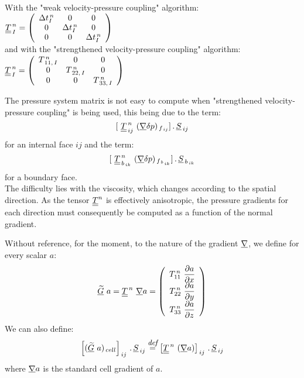 With the "weak velocity-pressure coupling" algorithm:
$ \underline{\underline{T}}_{\,I}^{\,n} = \left(
                      \begin{array} {ccc}
                      \Delta t_I^{\,n} & 0 & 0 \\
                      0 & \Delta t_I^{\,n} & 0 \\
                      0 & 0 & \Delta t_I^{\,n}
                      \end{array}
                \right) $\\
and with the "strengthened velocity-pressure coupling" algorithm:
$ \underline{\underline{T}}_{\,I}^{\,n} = \left(
                      \begin{array} {ccc}
                      T_{\,11,\,I}^{\,n} & 0 & 0 \\
                      0 &  T_{\,22,\,I}^{\,n}&0 \\
                      0 & 0 & T_{\,33,\,I}^{\,n}
                      \end{array}
                \right) $

The pressure system matrix is not easy to compute when "strengthened velocity-pressure coupling" is being used, this being due to the term:
$$[\ \underline{\underline{T}}^{\,n}_{\,ij}\ (\underline{\nabla}{\delta
p})_{\,f_{\,ij}}]\,.\,\underline{S}_{\,ij}$$ for an internal face $ij$ and the term: $$[\ \tens{T}^{\,n}_{\,b_{\,ik}}\ (\grad{\delta p})_{\,f_{\,b_{\,ik}}}]\,.
\,\vect{S}_{\,b_{\,ik}}$$ for a boundary face.\\
The difficulty lies with the viscosity, which changes according to the spatial direction. As the tensor  $\underline{\underline{T}}^n$ is effectively anisotropic, the pressure gradients for each direction must consequently be computed as a function of the normal gradient.

Without reference, for the moment, to the nature of the gradient $\underline{\nabla}$, we define for every scalar $a$:
$$ \vect{\widetilde{G}}\ a = \tens{T}^{\,n}\ \grad{a} =
              \left(
                    \begin{array} {c}
                    \displaystyle T_{11}^{\,n}\ \frac{\partial a}{\partial x}\\
                    \displaystyle T_{22}^{\,n}\ \frac{\partial a}{\partial y}\\
                    \displaystyle T_{33}^{\,n}\ \frac{\partial a}{\partial z}
                    \end{array}
              \right)
$$
We can also define:\\
$$ \left[(\vect{\widetilde{G}}\ a )_{\,cell}\right]_{\,ij}\,.\,\vect{S}_{\,ij} \overset{\text{\it\small def}}{=} \left[\tens{T}^{\,n}\ (\grad{a})\right]_{\,ij}\,.\,\vect{S}_{\,ij} $$  where
$\underline{\nabla}{a}$ is the standard cell gradient of $a$.\\

